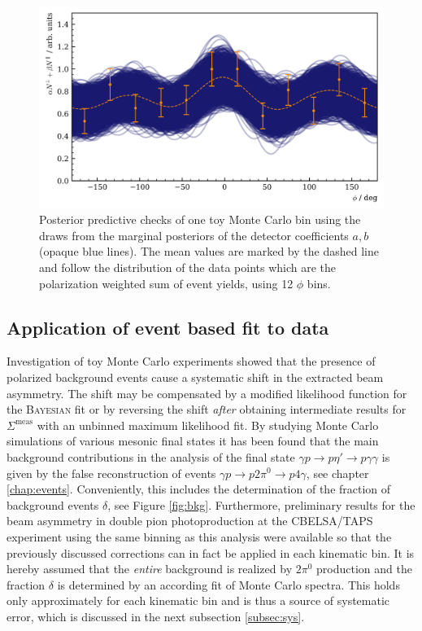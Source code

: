 \begin{figure}[htbp]
	\centering
	\includegraphics[width=\linewidth]{../bayes/etap_event_based_fit/plots/toyMC_eff_PPC.png}
	\caption{Posterior predictive checks of one toy Monte Carlo bin using the draws from the marginal posteriors of the detector coefficients $a,b$ (opaque blue lines). The mean values are marked by the dashed line and follow the distribution of the data points which are the polarization weighted sum of event yields, using 12 $\phi$ bins.}	
	\label{fig:toyMC_eff}
\end{figure}
\newpage
\subsection{Application of event based fit to data}
Investigation of toy Monte Carlo experiments showed that the presence of polarized background events cause a systematic shift in the extracted beam asymmetry. The shift may be compensated by a modified likelihood function for the \textsc{Bayesian} fit or by reversing the shift \emph{after} obtaining intermediate results for $\Sigma^\text{meas}$ with an unbinned maximum likelihood fit. By studying Monte Carlo simulations of various mesonic final states it has been found that the main background contributions in the analysis of the final state $\gamma p \to p\eta'\to p\gamma\gamma$ is given by the false reconstruction of events $\gamma p \to p 2\pi^0\to p 4\gamma$, see chapter \ref{chap:events}. Conveniently, this includes the determination of the fraction of background events $\delta$, see Figure \ref{fig:bkg}. Furthermore, preliminary results for the beam asymmetry in double pion photoproduction at the CBELSA/TAPS experiment using the same binning as this analysis \cite{mahlbergphd} were available so that the previously discussed corrections can in fact be applied in each kinematic bin. It is hereby assumed that the \emph{entire} background is realized by $2\pi^0$ production and the fraction $\delta$ is determined by an according fit of Monte Carlo spectra. This holds only approximately for each kinematic bin and is thus a source of systematic error, which is discussed in the next subsection \ref{subsec:sys}.

